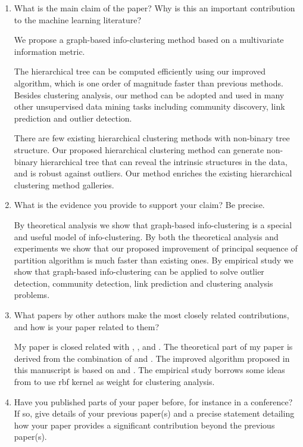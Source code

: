 \documentclass{article}
\begin{document}
\begin{enumerate}
\item What is the main claim of the paper? Why is this an important contribution to the machine learning literature?

    We propose a graph-based info-clustering method based on a multivariate information metric.
   
    The hierarchical tree can be computed efficiently using
    our improved algorithm, which is one order of magnitude faster than previous methods.
    Besides clustering analysis, our method can be adopted and
    used in many other unsupervised data mining tasks including community discovery, link prediction and outlier detection.
    
	There are few existing hierarchical clustering methods with non-binary tree structure. Our proposed hierarchical clustering method can generate non-binary hierarchical tree that can reveal the intrinsic structures in the data, and is robust against outliers. Our method enriches the existing
	hierarchical clustering method galleries.

\item What is the evidence you provide to support your claim? Be precise.

	By theoretical analysis we show that graph-based info-clustering is a special and useful model of info-clustering.
	By both the theoretical analysis and experiments we show that our proposed improvement of principal sequence of partition algorithm is
	much faster than existing ones. By empirical study we show that graph-based info-clustering can be applied to solve outlier detection, community detection,
	link prediction and clustering analysis problems.

\item What papers by other authors make the most closely related contributions, and how is your paper related to them?

    My paper is closed related with \cite{ic2016}, \cite{huang2017information}, \cite{narayanan} and \cite{mac}.
    The theoretical part of my paper is derived from the combination of \cite{ic2016} and \cite{huang2017information}.
    The improved algorithm proposed in this manuscript is based on \cite{narayanan} and \cite{mac}.
    The empirical study borrows some ideas from \cite{mac} to use rbf kernel as weight for clustering analysis.
 
\item Have you published parts of your paper before, for instance in a conference? If so, give details of your previous paper(s) and a precise statement detailing how your paper provides a significant contribution beyond the previous paper(s).


\end{enumerate}
\end{document}
